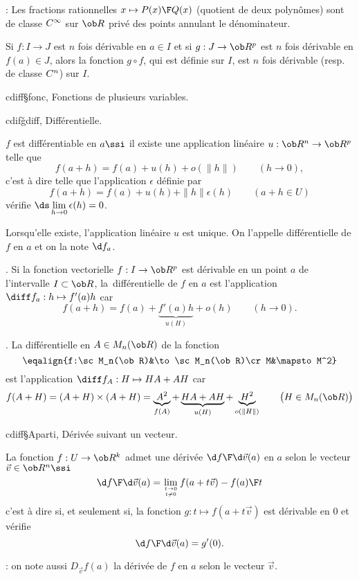 \Remarque  : Les fractions rationnelles $x\mapsto {P(x)\F Q(x)}$ (quotient de deux polynômes) sont de classe $\sc C^\infty$ sur $\ob R$ privé des points annulant le dénominateur. 
\bigskip

\Theoreme [$I$ et $J$ intervalles] 
Si $f:I\to J$ est $n$ fois dérivable en $a\in I$ et si $g:J\to\ob R^p$ est $n$ fois dérivable en $f(a)\in J$, 
alors la fonction $g\circ f$, qui est définie sur $I$, est $n$ fois dérivable (resp. de classe $\sc C^n$) sur $I$. 

\Section cdiff§fonc, Fonctions de plusieurs variables. 

\Subsection cdifǧdiff, Différentielle.

\Definition [$U$ ouvert de $\ob R^n$, $f:U\to\ob R^p$, $a\in U$] 
$f$ est différentiable en $a\ssi$ il existe une application linéaire $u:\ob R^n\to\ob R^p$ telle que 
$$
f(a+h)=f(a)+u(h)+o(\|h\|)\qquad(h\to0), 
$$
c'est à dire telle que l'application $\epsilon$ définie par 
$$
f(a+h)=f(a)+u(h)+\|h\|\epsilon(h)\qquad(a+h\in U)
$$ 
vérifie $\ds\lim\limits_{h\to0}\epsilon(h)=0$. 

\Propriete Lorsqu'elle existe, l'application linéaire $u$ est unique. On l'appelle différentielle de $f$ en $a$ et on la note $\d f_a$. 


\Exemple. Si la fonction vectorielle $f:I\to\ob R^p$ est dérivable en un point $a$ de l'intervalle $I\subset\ob R$, la~différentielle de $f$ en $a$ est l'application $\diff f_a:h\mapsto f'(a)h$ car 
$$
f(a+h)=f(a)+\underbrace{f'(a)h}_{u(H)}+o(h)\qquad(h\to 0). 
$$


\Exemple. La différentielle en $A\in\sc M_n(\ob R)$ de la fonction
$$
\eqalign{f:\sc M_n(\ob R)&\to\sc M_n(\ob R)\cr
M&\mapsto M^2}
$$
est l'application $\diff f_A:H\mapsto HA+AH$ car 
$$
f(A+H)=(A+H)\times(A+H)=\underbrace{A^2}_{f(A)}+\underbrace{HA+AH}_{u(H)}
+\underbrace{H^2}_{o(\|H\|)}\qquad\big(H\in\sc M_n(\ob R)\big)
$$


\Subsection cdiff§Aparti, Dérivée suivant un vecteur.


\Definition[$a\in U$ ouvert de $\ob R^n$]
La fonction $f:U\to\ob R^k$ admet une dérivée ${\d f\F\d\vec v}(a)$ en $a$ selon le vecteur $\vec v\in\ob R^n\ssi$ 
$$
{\d f\F\d\vec v}(a)=\lim\limits_{t\to0\atop t\neq 0}{f(a+t\vec v)-f(a)\F t}
$$
c'est à dire si, et seulement si, la fonction $g:t\mapsto f(a+t\vec v)$ est dérivable en $0$ et vérifie $$
{\d f\F\d\vec v}(a)=g'(0).
$$ 

\Remarque : on note aussi $D_{\vec v}f(a)$ la dérivée de $f$ en $a$ selon le vecteur $\vec v$. 
\bigskip


